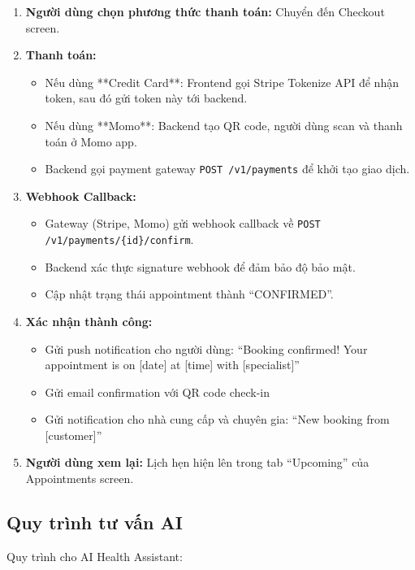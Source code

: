 \begin{enumerate}
    \item \textbf{Người dùng chọn phương thức thanh toán:} Chuyển đến Checkout screen.
    
    \item \textbf{Thanh toán:}
    \begin{itemize}
        \item Nếu dùng **Credit Card**: Frontend gọi Stripe Tokenize API để nhận token, sau đó gửi token này tới backend.
        \item Nếu dùng **Momo**: Backend tạo QR code, người dùng scan và thanh toán ở Momo app.
        \item Backend gọi payment gateway \texttt{POST /v1/payments} để khởi tạo giao dịch.
    \end{itemize}
    
    \item \textbf{Webhook Callback:}
    \begin{itemize}
        \item Gateway (Stripe, Momo) gửi webhook callback về \texttt{POST /v1/payments/\{id\}/confirm}.
        \item Backend xác thực signature webhook để đảm bảo độ bảo mật.
        \item Cập nhật trạng thái appointment thành ``CONFIRMED''.
    \end{itemize}
    
    \item \textbf{Xác nhận thành công:}
    \begin{itemize}
        \item Gửi push notification cho người dùng: ``Booking confirmed! Your appointment is on [date] at [time] with [specialist]''
        \item Gửi email confirmation với QR code check-in
        \item Gửi notification cho nhà cung cấp và chuyên gia: ``New booking from [customer]''
    \end{itemize}
    
    \item \textbf{Người dùng xem lại:} Lịch hẹn hiện lên trong tab ``Upcoming'' của Appointments screen.
\end{enumerate}

\subsection{Quy trình tư vấn AI}

Quy trình cho AI Health Assistant:

